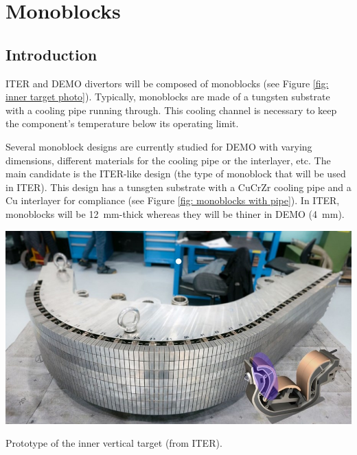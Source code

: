 \setchapterpreamble[u]{\margintoc}
\chapter{Monoblocks}
\section{Introduction}
ITER and DEMO divertors will be composed of monoblocks (see Figure \ref{fig: inner target photo}).
Typically, monoblocks are made of a tungsten substrate with a cooling pipe running through.
This cooling channel is necessary to keep the component's temperature below its operating limit.


Several monoblock designs are currently studied for DEMO with varying dimensions, different materials for the cooling pipe or the interlayer, etc.
The main candidate is the ITER-like design (the type of monoblock that will be used in ITER).
This design has a tunsgten substrate with a CuCrZr cooling pipe and a Cu interlayer for compliance (see Figure \ref{fig: monoblocks with pipe}).
In ITER, monoblocks will be \SI{12}{mm}-thick whereas they will be thiner in DEMO (\SI{4}{mm}).

\begin{marginfigure}
    \centering
    \includegraphics[width=\linewidth]{Figures/Chapter3/inner_target_iter.jpg}
    \caption{Prototype of the inner vertical target (from ITER).}
    \label{fig: inner target photo}
\end{marginfigure}

